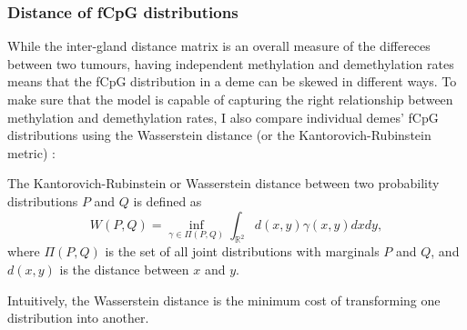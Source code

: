 \subsubsection{Distance of fCpG distributions}
While the inter-gland distance matrix is an overall measure of the differeces
between two tumours, having independent methylation and demethylation rates
means that the fCpG distribution in a deme can be skewed in different ways. To
make sure that the model is capable of capturing the right relationship between
methylation and demethylation rates, I also compare individual demes' fCpG
distributions using the Wasserstein distance (or the Kantorovich-Rubinstein
metric) \cite{kantorovich_mathematical_1960}:
\begin{definition}
    The Kantorovich-Rubinstein or Wasserstein distance between two probability
    distributions $P$ and $Q$ is defined as
    \begin{equation}
        W(P, Q) = \inf_{\gamma\in\Pi(P, Q)}\int_{\mathbb{R}^2}d(x, y)\gamma(x,
        y)dxdy,
    \end{equation}
    where $\Pi(P, Q)$ is the set of all joint distributions with marginals $P$
    and $Q$, and $d(x, y)$ is the distance between $x$ and $y$.
\end{definition}
Intuitively, the Wasserstein distance is the minimum cost of transforming one
distribution into another.

